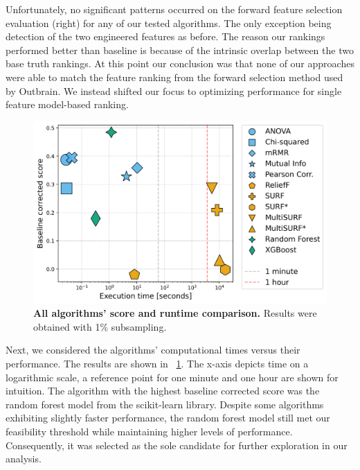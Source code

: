 \documentclass[fleqn,moreauthors,10pt]{ds_report}
\begin{document}
Unfortunately, no significant patterns occurred on the forward feature selection evaluation (right) for any of our tested algorithms. The only exception being detection of the two engineered features as before. The reason our rankings performed better than baseline is because of the intrinsic overlap between the two base truth rankings. At this point our conclusion was that none of our approaches were able to match the feature ranking from the forward selection method used by Outbrain. We instead shifted our focus to optimizing performance for single feature model-based ranking.

\begin{figure}[!h]
	\includegraphics[width=\linewidth]{img/all_algos.png}
	\caption{\textbf{All algorithms' score and runtime comparison.} Results were obtained with 1\% subsampling.}
	\label{fig:all_algos}
\end{figure}

Next, we considered the algorithms' computational times versus their performance. The results are shown in \figurename~\ref{fig:all_algos}. The x-axis depicts time on a logarithmic scale, a reference point for one minute and one hour are shown for intuition. The algorithm with the highest baseline corrected score was the random forest model from the scikit-learn library. Despite some algorithms exhibiting slightly faster performance, the random forest model still met our feasibility threshold while maintaining higher levels of performance. Consequently, it was selected as the sole candidate for further exploration in our analysis.

\end{document}
